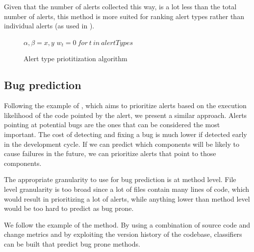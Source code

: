 \documentclass{article}
\begin{document}
Given that the number of alerts collected this way, is a lot less than the total number of alerts, this method is more suited for ranking alert types rather than individual alerts (as used in \cite{which_warnings}).

\begin{figure}[ht]
	\centering
	\begin{minipage}{.5\linewidth}
		\begin{algorithm}[H]
			\SetAlgoLined
			$\alpha, \beta = x, y$\;
			$w_t = 0 \ for \ t \ in \ alertTypes$\;
			\caption{Alert type priotitization algorithm}
		\end{algorithm}
	\end{minipage}
\end{figure}

\subsection{Bug prediction}

Following the example of \cite{static_profiling}, which aims to prioritize alerts based on the execution likelihood of the code pointed by the alert, we present a similar approach. Alerts pointing at potential bugs are the ones that can be considered the most important. The cost of detecting and fixing a bug is much lower if detected early in the development cycle. If we can predict which components will be likely to cause failures in the future, we can prioritize alerts that point to those components. 

The appropriate granularity to use for bug prediction is at method level. File level granularity is too broad since a lot of files contain many lines of code, which would result in prioritizing a lot of alerts, while anything lower than method level would be too hard to predict as bug prone.

We follow the example of the \cite{prediction_method} method. By using a combination of source code and change metrics and by exploiting the version history of the codebase, classifiers can be built that predict bug prone methods.
\end{document}
